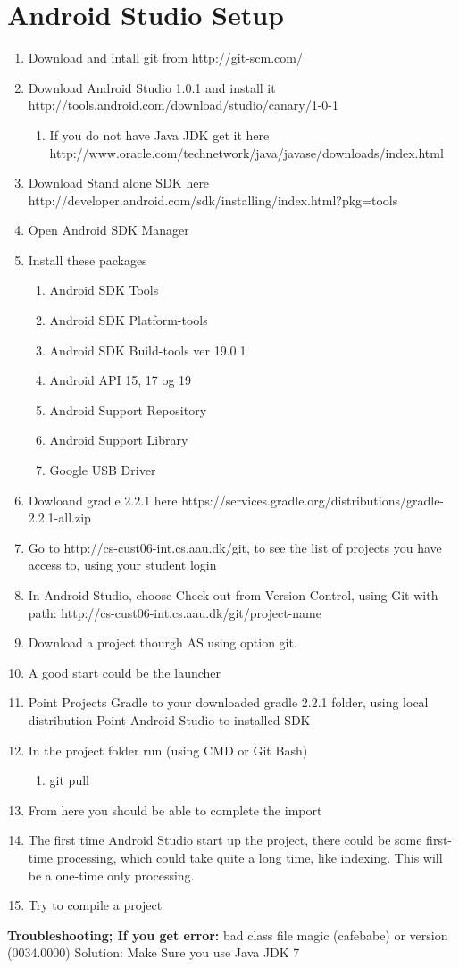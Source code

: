 \chapter{Android Studio Setup}

\begin{enumerate}
	\item Download and intall git from http://git-scm.com/
	\item Download Android Studio 1.0.1 and install it http://tools.android.com/download/studio/canary/1-0-1
	\begin{enumerate}
		\item If you do not have Java JDK get it here http://www.oracle.com/technetwork/java/javase/downloads/index.html
	\end{enumerate}
	\item Download Stand alone SDK here http://developer.android.com/sdk/installing/index.html?pkg=tools
	\item Open Android SDK Manager
	\item Install these packages
	\begin{enumerate}
		\item Android SDK Tools
		\item Android SDK Platform-tools
		\item Android SDK Build-tools ver 19.0.1
		\item Android API 15, 17 og 19
		\item Android Support Repository
		\item Android Support Library
		\item Google USB Driver
	\end{enumerate}
	\item Dowloand gradle 2.2.1 here https://services.gradle.org/distributions/gradle-2.2.1-all.zip
	\item Go to http://cs-cust06-int.cs.aau.dk/git, to see the list of projects you have access to, using your student login
	\item In Android Studio, choose Check out from Version Control, using Git with path: http://cs-cust06-int.cs.aau.dk/git/{project-name}
	\item Download a project thourgh AS using option git.
	\item A good start could be the launcher
	\item Point Projects Gradle to your downloaded gradle 2.2.1 folder, using local distribution Point Android Studio to installed SDK
	\item In the project folder run (using CMD or Git Bash)
	\begin{enumerate}
		\item git pull
	\end{enumerate}
	\item From here you should be able to complete the import
	\item The first time Android Studio start up the project, there could be some first-time processing, which could take quite a long time, like indexing. This will be a one-time only processing.
	\item Try to compile a project
\end{enumerate}

\textbf{Troubleshooting; If you get error:}
bad class file magic (cafebabe) or version (0034.0000)
Solution: Make Sure you use Java JDK 7